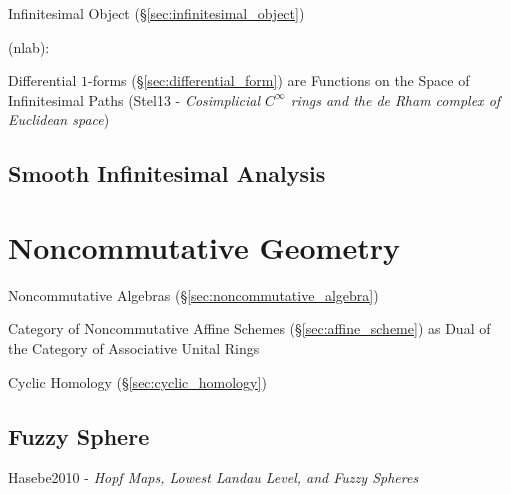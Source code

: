 \fist Infinitesimal Object (\S\ref{sec:infinitesimal_object})

(nlab):

Differential $1$-forms (\S\ref{sec:differential_form}) are Functions on the
Space of Infinitesimal Paths (Stel13 - \emph{Cosimplicial $C^\infty$ rings and
  the de Rham complex of Euclidean space})



\subsection{Smooth Infinitesimal Analysis}
\label{sec:smooth_infinitesimal_analysis}



\section{Noncommutative Geometry}\label{sec:noncommutative_geometry}

Noncommutative Algebras (\S\ref{sec:noncommutative_algebra})

Category of Noncommutative Affine Schemes (\S\ref{sec:affine_scheme}) as Dual of
the Category of Associative Unital Rings

Cyclic Homology (\S\ref{sec:cyclic_homology})



\subsection{Fuzzy Sphere}\label{sec:fuzzy_sphere}

Hasebe2010 - \emph{Hopf Maps, Lowest Landau Level, and Fuzzy Spheres}
